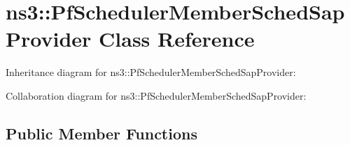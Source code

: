 \hypertarget{classns3_1_1PfSchedulerMemberSchedSapProvider}{}\section{ns3\+:\+:Pf\+Scheduler\+Member\+Sched\+Sap\+Provider Class Reference}
\label{classns3_1_1PfSchedulerMemberSchedSapProvider}


Inheritance diagram for ns3\+:\+:Pf\+Scheduler\+Member\+Sched\+Sap\+Provider\+:


Collaboration diagram for ns3\+:\+:Pf\+Scheduler\+Member\+Sched\+Sap\+Provider\+:
\subsection*{Public Member Functions}
